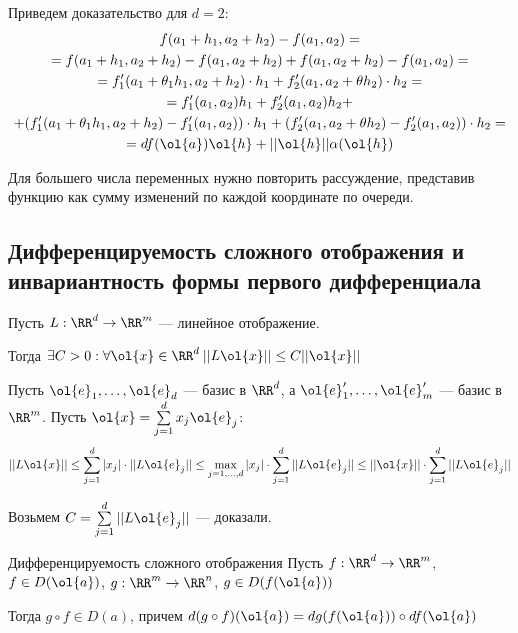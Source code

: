 Приведем доказательство для \( d = 2 \):
\begin{gather*}
    f(a_1 + h_1, a_2 + h_2) - f(a_1, a_2)
    =
    \\
    =
    f(a_1 + h_1, a_2 + h_2) - f(a_1, a_2 + h_2) + f(a_1, a_2 + h_2) - f(a_1, a_2)
    =
    \\
    =
    f_1'(a_1 + \theta_1 h_1, a_2 + h_2) \cdot h_1 + f_2'(a_1, a_2 + \theta h_2) \cdot h_2
    =
    \\
    =
    f_1'(a_1, a_2) h_1 + f_2'(a_1, a_2) h_2
        + \\
        + ( f_1'(a_1 + \theta_1 h_1, a_2 + h_2) - f_1'(a_1, a_2) ) \cdot h_1
        + ( f_2'(a_1, a_2 + \theta h_2) - f_2'(a_1, a_2) ) \cdot h_2
    =
    \\
    =
    df(\ol{a}) \ol{h} + || \ol{h} || \alpha(\ol{h})
\end{gather*}

Для большего числа переменных нужно повторить рассуждение,
представив функцию как сумму изменений по каждой координате по очереди.

\subsection{Дифференцируемость сложного отображения и инвариантность формы первого дифференциала}

\begin{prop}{}{}
    Пусть \( L : \RR^d \to \RR^m \) --- линейное отображение.

    Тогда \( \exists C > 0 : \forall \ol{x} \in \RR^d \: || L \ol{x} || \leq C || \ol{x} || \)
\end{prop}

Пусть \( \ol{e}_1, \ldots, \ol{e}_d \) --- базис в \( \RR^d \),
а \( \ol{e}_1', \ldots, \ol{e}_m' \) --- базис в \( \RR^m \).
Пусть \( \ol{x} = \sum\limits_{j = 1}^{d} x_j \ol{e}_j \):
\[
    || L \ol{x} ||
    \leq
    \sum\limits_{j = 1}^{d} |x_j| \cdot || L \ol{e}_j ||
    \leq
    \max\limits_{j = 1, \ldots, d} |x_j| \cdot \sum\limits_{j = 1}^{d} || L \ol{e}_j ||
    \leq
    || \ol{x} || \cdot \sum\limits_{j = 1}^{d} || L \ol{e}_j ||
\]

Возьмем \( C = \sum\limits_{j = 1}^{d} || L \ol{e}_j || \) --- доказали.

\begin{thrm}{Дифференцируемость сложного отображения}{}
    Пусть \( f : \RR^d \to \RR^m \), \( f \in D(\ol{a}) \), \( g : \RR^m \to \RR^n \), \( g \in D(f(\ol{a})) \)

    Тогда \( g \circ f \in D(a) \), причем \( d (g \circ f) (\ol{a}) = dg(f(\ol{a})) \circ df (\ol{a}) \)
\end{thrm}

